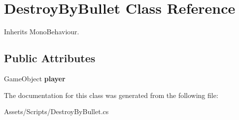 \hypertarget{class_destroy_by_bullet}{}\section{Destroy\+By\+Bullet Class Reference}
\label{class_destroy_by_bullet}


Inherits Mono\+Behaviour.

\subsection*{Public Attributes}
\begin{DoxyCompactItemize}
\item 
\mbox{\label{class_destroy_by_bullet_ac3225ab3c49d644840b85519aed90623}} 
Game\+Object {\bfseries player}
\end{DoxyCompactItemize}


The documentation for this class was generated from the following file\+:\begin{DoxyCompactItemize}
\item 
Assets/\+Scripts/Destroy\+By\+Bullet.\+cs\end{DoxyCompactItemize}
